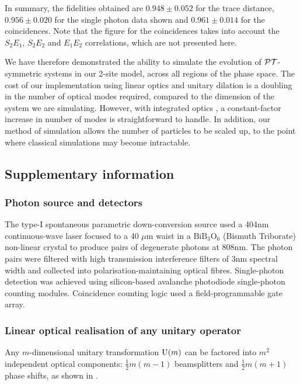 In summary, the fidelities obtained are \(0.948 \pm 0.052\) for the trace
distance, \(0.956 \pm 0.020\) for the single photon data shown and \(0.961 \pm
0.014\) for the coincidences. Note that the figure for the coincidences takes
into account the \(S_2 E_1\), \(S_2 E_2\) and \(E_1 E_2\) correlations, which
are not presented here.

We have therefore demonstrated the ability to simulate the evolution of
\(\mathcal{PT}\)-symmetric systems in our 2-site model, across all regions of the phase
space. The cost of our implementation using linear optics and unitary dilation
is a doubling in the number of optical modes required, compared to the dimension
of the system we are simulating. However, with integrated optics
, a constant-factor increase in number of modes is
straightforward to handle. In addition, our method of simulation allows the
number of particles to be scaled up, to the point where classical simulations
may become intractable.

\subsection{Supplementary information}
\subsubsection{Photon source and detectors}
The type-I spontaneous parametric down-conversion source used a 404nm
continuous-wave laser focused to a 40 \(\mu\)m waist in a \(\text{BiB}_3
\text{O}_6\) (Bismuth Triborate) non-linear crystal to produce pairs of
degenerate photons at 808nm. The photon pairs were filtered with high
transmission interference filters of 3nm spectral width and collected into
polarisation-maintaining optical fibres. Single-photon detection was achieved
using silicon-based avalanche photodiode single-photon counting modules.
Coincidence counting logic used a field-programmable gate array.

\subsubsection{Linear optical realisation of any unitary operator}
Any \(m\)-dimensional unitary transformation \(\mathrm{U} \!\left(m\right)\) can be factored
into \(m^{2}\) independent optical components: \(\frac{1}{2} m \left( m-1
\right) \) beamsplitters and \(\frac{1}{2} m \left( m+1 \right) \) phase shifts,
as shown in \cite{reck-physrevlett-73-58}.

